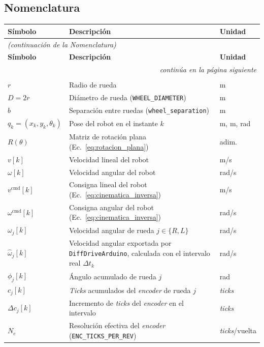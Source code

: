 \begin{appendices}
\section{Nomenclatura}
\label{anx:nomenclatura}
{\small
\begin{longtable}{p{2.7cm} p{8.5cm} p{2.2cm}}
\toprule
\textbf{Símbolo} & \textbf{Descripción} & \textbf{Unidad}\\
\midrule
\endfirsthead
\multicolumn{3}{l}{\small\itshape (continuación de la Nomenclatura)}\\
\toprule
\textbf{Símbolo} & \textbf{Descripción} & \textbf{Unidad}\\
\midrule
\endhead
\midrule
\multicolumn{3}{r}{\small\itshape continúa en la página siguiente}\\
\endfoot
\bottomrule
\endlastfoot
\multicolumn{3}{l}{\textit{Cinemática y odometría}}\\
$r$ & Radio de rueda & m \\
$D=2r$ & Diámetro de rueda (\texttt{WHEEL\_DIAMETER}) & m \\
$b$ & Separación entre ruedas (\texttt{wheel\_separation}) & m \\
$q_k=(x_k,y_k,\theta_k)$ & Pose del robot en el instante $k$ & m, m, rad \\
$R(\theta)$ & Matriz de rotación plana (Ec.~\eqref{eq:rotacion_plana}) & adim. \\
$v[k]$ & Velocidad lineal del robot & m/s \\
$\omega[k]$ & Velocidad angular del robot & rad/s \\
$v^{\mathrm{cmd}}[k]$ & Consigna lineal del robot (Ec.~\eqref{eq:cinematica_inversa}) & m/s \\
$\omega^{\mathrm{cmd}}[k]$ & Consigna angular del robot (Ec.~\eqref{eq:cinematica_inversa}) & rad/s \\
$\omega_j[k]$ & Velocidad angular de rueda $j\in\{R,L\}$ & rad/s \\
$\widehat{\omega}_j[k]$ & Velocidad angular exportada por \texttt{DiffDriveArduino}, calculada con el intervalo real $\Delta t_k$ & rad/s \\
$\phi_j[k]$ & Ángulo acumulado de rueda $j$ & rad \\
$c_j[k]$ & \textit{Ticks} acumulados del \textit{encoder} de rueda $j$ & \textit{ticks} \\
$\Delta c_j[k]$ & Incremento de \textit{ticks} del \textit{encoder} en el intervalo & \textit{ticks} \\
$N_e$ & Resolución efectiva del \textit{encoder} (\texttt{ENC\_TICKS\_PER\_REV}) & \textit{ticks}/vuelta \\

\end{longtable}}
\end{appendices}
